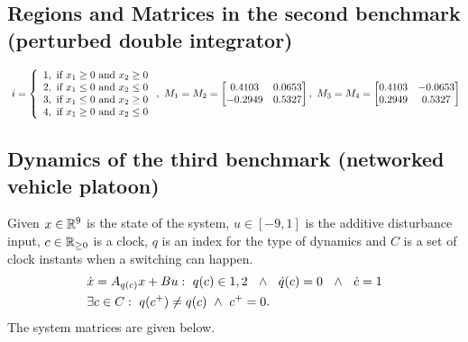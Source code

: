 \subsection*{Regions and Matrices in the second benchmark (perturbed double integrator)}
{\scriptsize
\begin{align*}~\label{eqn:pwa-regions}
i=\left\{\begin{array}{l}
1,~\text{if}~x_1\geq 0~\text{and}~x_2\geq 0\\
2,~\text{if}~x_1\leq 0~\text{and}~x_2\leq 0\\
3,~\text{if}~x_1\leq 0~\text{and}~x_2\geq 0\\
4,~\text{if}~x_1\geq 0~\text{and}~x_2\leq 0\\
\end{array} \right.,
~M_1=M_2=\left[\begin{matrix}
0.4103  &  0.0653\\
   -0.2949  &  0.5327
\end{matrix}\right],~M_3=M_4=\left[\begin{matrix}
0.4103  &  -0.0653\\
   0.2949  &  0.5327
\end{matrix}\right]
\end{align*}}


\subsection*{Dynamics of the third benchmark (networked vehicle platoon)}
Given $x\in\mathbb{R}^9$ is the state of the system, $u\in[-9,1]$ is the additive
disturbance input, $c\in\mathbb{R}_{\geq 0}$ is a clock, $q$ is an index
for the type of dynamics and $C$ is a set of clock instants when a
switching can happen.
 \begin{align*} &\dot{x} = A_{q(c)}x+B
u:~q(c)\in{1,2}~~\wedge~~\dot{q}(c)=0~~\wedge~~\dot{c}=1\\ &\exists
c\in C:~q(c^+)\neq q(c)~\wedge~c^+=0.
\vspace{-2em}
\end{align*}
 The system matrices are given below.

